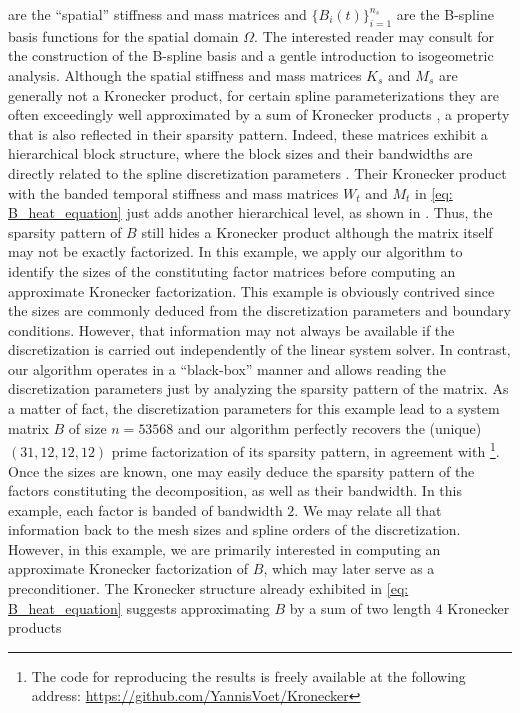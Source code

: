 \documentclass{article}
\numberwithin{equation}{section}
\theoremstyle{definition}
\begin{document}
are the ``spatial'' stiffness and mass matrices and $\{B_i(t)\}_{i=1}^{n_s}$ are the B-spline basis functions for the spatial domain $\Omega$. The interested reader may consult \cite{hughes2005isogeometric,cottrell2009isogeometric} for the construction of the B-spline basis and a gentle introduction to isogeometric analysis. Although the spatial stiffness and mass matrices $K_s$ and $M_s$ are generally not a Kronecker product, for certain spline parameterizations they are often exceedingly well approximated by a sum of Kronecker products \cite{hofreither2018black,mantzaflaris2017low,scholz2018partial}, a property that is also reflected in their sparsity pattern. Indeed, these matrices exhibit a hierarchical block structure, where the block sizes and their bandwidths are directly related to the spline discretization parameters \cite{hofreither2018black,voet2025mass}. Their Kronecker product with the banded temporal stiffness and mass matrices $W_t$ and $M_t$ in \eqref{eq: B_heat_equation} just adds another hierarchical level, as shown in . Thus, the sparsity pattern of $B$ still hides a Kronecker product although the matrix itself may not be exactly factorized. In this example, we apply our algorithm to identify the sizes of the constituting factor matrices before computing an approximate Kronecker factorization. This example is obviously contrived since the sizes are commonly deduced from the discretization parameters and boundary conditions. However, that information may not always be available if the discretization is carried out independently of the linear system solver. In contrast, our algorithm operates in a ``black-box'' manner and allows reading the discretization parameters just by analyzing the sparsity pattern of the matrix. As a matter of fact, the discretization parameters for this example lead to a system matrix $B$ of size $n=53568$ and our algorithm perfectly recovers the (unique) $(31,12,12,12)$ prime factorization of its sparsity pattern, in agreement with \footnote{The code for reproducing the results is freely available at the following address: \url{https://github.com/YannisVoet/Kronecker}}. Once the sizes are known, one may easily deduce the sparsity pattern of the factors constituting the decomposition, as well as their bandwidth. In this example, each factor is banded of bandwidth $2$. We may relate all that information back to the mesh sizes and spline orders of the discretization. However, in this example, we are primarily interested in computing an approximate Kronecker factorization of $B$, which may later serve as a preconditioner. The Kronecker structure already exhibited in \eqref{eq: B_heat_equation} suggests approximating $B$ by a sum of two length $4$ Kronecker products
\end{document}
